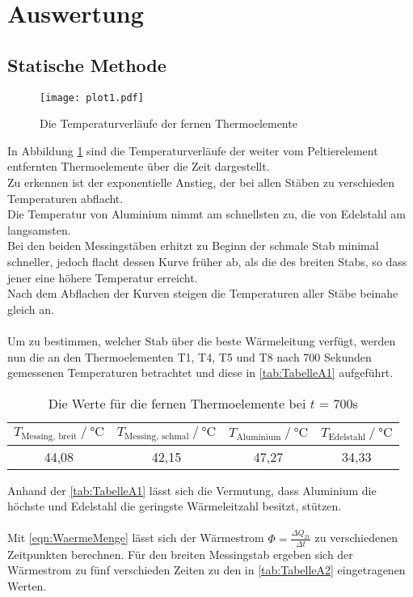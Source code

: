 \section{Auswertung}
\label{sec:Auswertung}

\subsection{Statische Methode}
\label{Statische Methode}

\begin{figure}[H]
  \centering
  \texttt{[image: plot1.pdf]}
  \caption{Die Temperaturverläufe der fernen Thermoelemente}
  \label{fig:plot1}
\end{figure}

In Abbildung \ref{fig:plot1} sind die Temperaturverläufe der
weiter vom Peltierelement entfernten Thermoelemente über die Zeit 
dargestellt.\\
Zu erkennen ist der exponentielle Anstieg, der bei allen Stäben zu verschieden Temperaturen 
abflacht. \\
Die Temperatur von Aluminium nimmt am schnellsten zu, die von Edelstahl am langsamsten.\\
Bei den beiden Messingstäben erhitzt zu Beginn der schmale Stab minimal schneller, 
jedoch flacht dessen Kurve früher ab, als die des breiten Stabs, so dass jener eine höhere 
Temperatur erreicht.\\
Nach dem Abflachen der Kurven steigen die Temperaturen aller Stäbe beinahe gleich an.\\
\\
Um zu bestimmen, welcher Stab über die beste Wärmeleitung 
verfügt, werden nun die an den Thermoelementen T1, T4, T5 und T8 nach 700 Sekunden
gemessenen Temperaturen betrachtet und diese in \autoref{tab:TabelleA1} aufgeführt.

\begin{table}[H]
  \centering
  \caption{Die Werte für die fernen Thermoelemente bei $t$ = 700s}
  \begin{tabular}{cccc}
    \toprule
    {$T_{\textrm{Messing, breit}} \mathbin{/} \unit{\degreeCelsius}$} &
    {$T_{\textrm{Messing, schmal}} \mathbin{/} \unit{\degreeCelsius}$} &    %
    {$T_{\textrm{Aluminium}} \mathbin{/} \unit{\degreeCelsius}$} &
    {$T_{\textrm{Edelstahl}} \mathbin{/} \unit{\degreeCelsius}$} \\
    \midrule
    44,08 & 42,15 & 47,27 & 34,33 \\   
    \bottomrule
  \end{tabular}
  \label{tab:TabelleA1}
\end{table}
\noindent Anhand der \autoref{tab:TabelleA1} lässt sich die Vermutung, dass Aluminium die höchste und 
Edelstahl die geringste Wärmeleitzahl besitzt, stützen. \\
\\
Mit \ref{eqn:WaermeMenge} lässt sich der Wärmestrom $\Phi = \frac{\Delta Q_{21}}{\Delta t}$ zu verschiedenen Zeitpunkten berechnen.
Für den breiten Messingstab ergeben sich der Wärmestrom zu fünf verschieden Zeiten zu den in \autoref{tab:TabelleA2} eingetragenen Werten.\\

